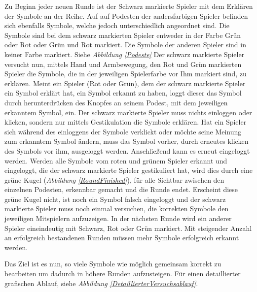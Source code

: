\documentclass[a4paper,11pt]{article}%
\renewcommand{\\}{\vspace*{0.5\baselineskip} \newline}
\begin{document}
Zu Beginn jeder neuen Runde ist der Schwarz markierte Spieler mit dem Erklären der Symbole an der Reihe.
Auf auf Podesten der andersfarbigen Spieler befinden sich ebenfalls Symbole, welche jedoch unterschiedlich angeordnet sind. Die Symbole sind bei dem schwarz markierten Spieler entweder in der Farbe \dq{}Grün oder Rot\dq{} oder \dq{}Grün und Rot\dq{} markiert. Die Symbole der anderen Spieler sind in keiner Farbe markiert. Siehe \textit{Abbildung \ref{Podeste}}
Der schwarz markierte Spieler versucht nun, mittels Hand und Armbewegung, den Rot und Grün markierten Spieler die Symbole, die in der jeweiligen Spielerfarbe vor Ihm markiert sind, zu erklären.
Meint ein Spieler (Rot oder Grün), dem der schwarz markierte Spieler ein Symbol erklärt hat, ein Symbol erkannt zu haben, loggt dieser das Symbol durch herunterdrücken des Knopfes an seinem Podest, mit dem jeweiligen erkanntem Symbol, ein. Der schwarz markierte Spieler muss nichts einloggen oder klicken, sondern nur mittels Gestikulation die Symbole erklären.
Hat ein Spieler sich während des einloggens der Symbole verklickt oder möchte seine Meinung zum erkanntem Symbol ändern, muss das Symbol vorher, durch erneutes klicken des Symbols vor ihm, ausgeloggt werden. Anschließend kann es erneut eingeloggt werden.
Werden alle Symbole vom roten und grünem Spieler erkannt und eingeloggt, die der schwarz markierte Spieler gestikuliert hat, wird dies durch eine grüne Kugel (\textit{Abbildung \ref{RoundFinished}}), für alle Sichtbar zwischen den einzelnen Podesten, erkennbar gemacht und die Runde endet. Erscheint diese grüne Kugel nicht, ist noch ein Symbol falsch eingeloggt und der schwarz markierte Spieler muss noch einmal versuchen, die korrekten Symbole den jeweiligen Mitspielern aufzuzeigen.
In der nächsten Runde wird ein anderer Spieler eineindeutig mit Schwarz, Rot oder Grün markiert.
Mit steigender Anzahl an erfolgreich bestandenen Runden müssen mehr Symbole erfolgreich erkannt werden.

Das Ziel ist es nun, so viele Symbole wie möglich gemeinsam korrekt zu bearbeiten um dadurch in höhere Runden aufzusteigen.
Für einen detaillierter grafischen Ablauf, siehe \textit{Abbildung \ref{DetaillierterVersuchsablauf}}.
\end{document}
